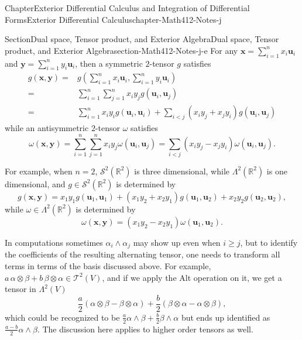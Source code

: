 \documentclass[oneside,10pt,]{book}
\numberwithin{equation}{section}
\newcommand{\bu}{\mathbf{u}}
\newcommand{\bx}{\mathbf{x}}
\newcommand{\by}{\mathbf{y}}
\newcommand{\bbR}{\mathbb{R}}
\newcommand{\amp}{&}
\begin{document}
\begin{chapterptx}{Chapter}{Exterior Differential Calculus and Integration of Differential Forms}{}{Exterior Differential Calculus}{}{}{chapter-Math412-Notes-j}
\begin{sectionptx}{Section}{Dual space, Tensor product, and Exterior Algebra}{}{Dual space, Tensor product, and Exterior Algebra}{}{}{section-Math412-Notes-j-e}
For any \(\bx =\sum_{i=1}^{n}x_{i} \bu_{i}\) and \(\by =\sum_{i=1}^{n}y_{i} \bu_{i}\), then a symmetric \(2\)-tensor \(g\) satisfies%
\begin{align*}
g(\bx, \by)= \amp g(\sum_{i=1}^{n}x_{i} \bu_{i}, \sum_{i=1}^{n}y_{i} \bu_{i})\\
=\amp \sum_{i=1}^{n}\sum_{j=1}^{n}x_{i} y_{j }g( \bu_{i}, \bu_{j})\\
=\amp \sum_{i=1}^{n} x_{i} y_{i }g( \bu_{i}, \bu_{i}) +
\sum_{i < j} \left(x_{i} y_{j }+ x_{j}y_{i}\right) g( \bu_{i}, \bu_{j})
\end{align*}
while an antisymmetric \(2\)-tensor \(\omega\) satisfies%
\begin{equation*}
\omega(\bx, \by)= \sum_{i=1}^{n}\sum_{j=1}^{n}x_{i} y_{j }\omega( \bu_{i}, \bu_{j})
=\sum_{i < j} \left(x_{i} y_{j }- x_{j}y_{i}\right) \omega ( \bu_{i}, \bu_{j}).
\end{equation*}
%
\par
For example, when \(n=2\), \({\mathcal S}^{2}(\bbR^{2})\) is three dimensional, while \(\Lambda^{2}(\bbR^{2})\) is one dimensional, and \(g\in {\mathcal S}^{2}(\bbR^{2})\) is determined by%
\begin{equation*}
g(\bx, \by)=x_{1}y_{1}g(\bu_{1}, \bu_{1})+(x_{1}y_{2}+x_{2}y_{1})g(\bu_{1}, \bu_{2})+
x_{2}y_{2}g(\bu_{2}, \bu_{2}),
\end{equation*}
while \(\omega \in { \Lambda}^{2}(\bbR^{2})\) is determined by%
\begin{equation*}
\omega(\bx, \by)=(x_{1}y_{2}-x_{2}y_{1})\omega(\bu_{1}, \bu_{2}).
\end{equation*}
%
\par
In computations sometimes \(\alpha_{i}\wedge \alpha_{j}\) may show up even when \(i\ge j\), but to identify the coefficients of  the resulting alternating tensor, one needs to transform all terms in terms of the basis discussed above. For example, \(a\, \alpha\otimes \beta + b\, \beta\otimes \alpha \in {\mathcal T}^{2}(V)\), and if we apply the Alt operation on it, we get a tensor in \(\Lambda^{2}(V)\)%
\begin{equation*}
\frac{a}{2} \left(\alpha\otimes \beta- \beta\otimes \alpha\right)
+\frac{b}{2} \left( \beta\otimes \alpha- \alpha\otimes \beta \right),
\end{equation*}
which  could be recognized to be \(\frac{a}{2} \alpha\wedge \beta + \frac{b}{2}\beta\wedge\alpha\) but ends up identified as \(\frac{a-b}{2} \alpha\wedge \beta\). The discussion here applies to higher order tensors as well.%
\par

\end{sectionptx}
\end{chapterptx}
\end{document}
